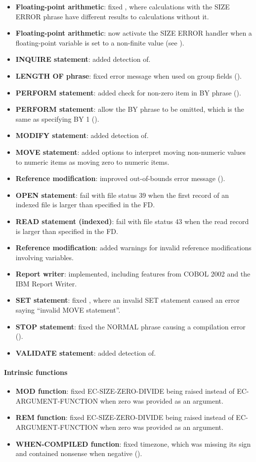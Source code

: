 \begin{itemize}
\item \textbf{Floating-point arithmetic}: fixed , where calculations with the SIZE ERROR phrase have different results to calculations without it.
\item \textbf{Floating-point arithmetic}: now activate the SIZE ERROR handler when a floating-point variable is set to a non-finite value (see ).
\item \textbf{INQUIRE statement}: added detection of.
\item \textbf{LENGTH OF phrase}: fixed error message when used on group fields ().
\item \textbf{PERFORM statement}: added check for non-zero item in BY phrase ().
\item \textbf{PERFORM statement}: allow the BY phrase to be omitted, which is the same as specifying BY 1 ().
\item \textbf{MODIFY statement}: added detection of.
\item \textbf{MOVE statement}: added options to interpret moving non-numeric values to numeric items as moving zero to numeric items.
\item \textbf{Reference modification}: improved out-of-bounds error message ().
\item \textbf{OPEN statement}: fail with file status 39 when the first record of an indexed file is larger than specified in the FD.
\item \textbf{READ statement (indexed)}: fail with file status 43 when the read record is larger than specified in the FD.
\item \textbf{Reference modification}: added warnings for invalid reference modifications involving variables.
\item \textbf{Report writer}: implemented, including features from COBOL 2002 and the IBM Report Writer.
\item \textbf{SET statement}: fixed , where an invalid SET statement caused an error saying ``invalid MOVE statement''.
\item \textbf{STOP statement}: fixed the NORMAL phrase causing a compilation error ().
\item \textbf{VALIDATE statement}: added detection of.
\end{itemize}

\paragraph{Intrinsic functions}
\begin{itemize}
\item \textbf{MOD function}: fixed EC-SIZE-ZERO-DIVIDE being raised instead of EC-ARGUMENT-FUNCTION when zero was provided as an argument.
\item \textbf{REM function}: fixed EC-SIZE-ZERO-DIVIDE being raised instead of EC-ARGUMENT-FUNCTION when zero was provided as an argument.
\item \textbf{WHEN-COMPILED function}: fixed timezone, which was missing its sign and contained nonsense when negative ().
\end{itemize}

